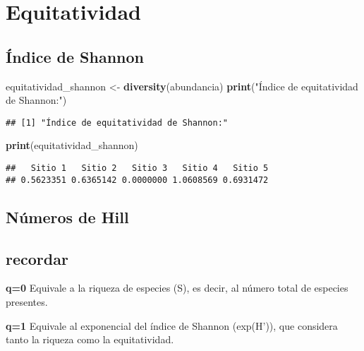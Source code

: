 \documentclass[
]{article}
\newenvironment{Shaded}{\begin{snugshade}}{\end{snugshade}}
\newcommand{\FunctionTok}[1]{\textcolor[rgb]{0.13,0.29,0.53}{\textbf{#1}}}
\newcommand{\NormalTok}[1]{#1}
\newcommand{\OtherTok}[1]{\textcolor[rgb]{0.56,0.35,0.01}{#1}}
\newcommand{\StringTok}[1]{\textcolor[rgb]{0.31,0.60,0.02}{#1}}
\begin{document}
\hypertarget{equitatividad}{%
\section{Equitatividad}\label{equitatividad}}

\hypertarget{uxedndice-de-shannon}{%
\subsection{Índice de Shannon}\label{uxedndice-de-shannon}}

\begin{Shaded}
\begin{Highlighting}[]
\NormalTok{equitatividad\_shannon }\OtherTok{\textless{}{-}} \FunctionTok{diversity}\NormalTok{(abundancia)}
\FunctionTok{print}\NormalTok{(}\StringTok{"Índice de equitatividad de Shannon:"}\NormalTok{)}
\end{Highlighting}
\end{Shaded}

\begin{verbatim}
## [1] "Índice de equitatividad de Shannon:"
\end{verbatim}

\begin{Shaded}
\begin{Highlighting}[]
\FunctionTok{print}\NormalTok{(equitatividad\_shannon)}
\end{Highlighting}
\end{Shaded}

\begin{verbatim}
##   Sitio 1   Sitio 2   Sitio 3   Sitio 4   Sitio 5 
## 0.5623351 0.6365142 0.0000000 1.0608569 0.6931472
\end{verbatim}

\hypertarget{nuxfameros-de-hill}{%
\subsection{Números de Hill}\label{nuxfameros-de-hill}}

\hypertarget{recordar}{%
\subsection{recordar}\label{recordar}}

\textbf{q=0} Equivale a la riqueza de especies (S), es decir, al número
total de especies presentes.

\textbf{q=1} Equivale al exponencial del índice de Shannon (exp(H')),
que considera tanto la riqueza como la equitatividad.
\end{document}
